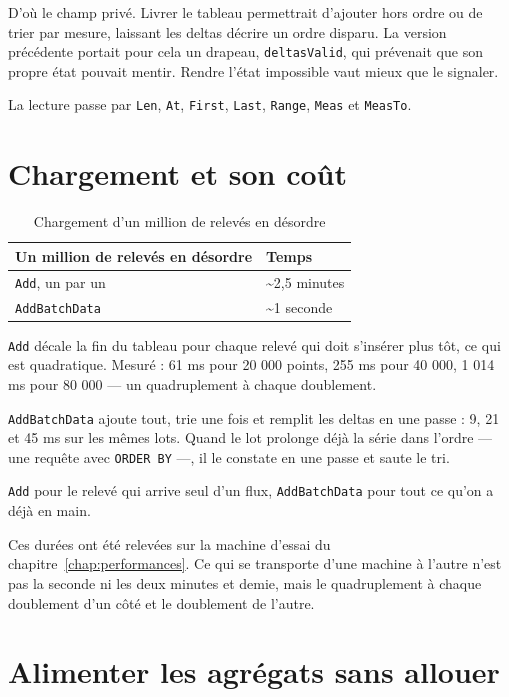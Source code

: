 \documentclass[11pt,a4paper]{report}
\begin{document}
D'où le champ privé. Livrer le tableau permettrait d'ajouter hors ordre
ou de trier par mesure, laissant les deltas décrire un ordre disparu. La
version précédente portait pour cela un drapeau, \texttt{deltasValid},
qui prévenait que son propre état pouvait mentir. Rendre l'état
impossible vaut mieux que le signaler.

La lecture passe par \texttt{Len}, \texttt{At}, \texttt{First},
\texttt{Last}, \texttt{Range}, \texttt{Meas} et \texttt{MeasTo}.

\section{Chargement et son coût}\label{sec:chargement}

\begin{longtable}[]{@{}ll@{}}
\caption{Chargement d'un million de relevés en désordre}\label{tab:chargement}\\
\toprule\noalign{}
Un million de relevés en désordre & Temps \\
\midrule\noalign{}
\endhead
\bottomrule\noalign{}
\endlastfoot
\texttt{Add}, un par un & \textasciitilde2,5 minutes \\
\texttt{AddBatchData} & \textasciitilde1 seconde \\
\end{longtable}

\texttt{Add} décale la fin du tableau pour chaque relevé qui doit
s'insérer plus tôt, ce qui est quadratique. Mesuré : 61 ms pour 20 000
points, 255 ms pour 40 000, 1 014 ms pour 80 000 --- un quadruplement à
chaque doublement.

\texttt{AddBatchData} ajoute tout, trie une fois et remplit les deltas
en une passe : 9, 21 et 45 ms sur les mêmes lots. Quand le lot prolonge
déjà la série dans l'ordre --- une requête avec \texttt{ORDER\ BY} ---,
il le constate en une passe et saute le tri.

\texttt{Add} pour le relevé qui arrive seul d'un flux,
\texttt{AddBatchData} pour tout ce qu'on a déjà en main.

Ces durées ont été relevées sur la machine d'essai du
chapitre~\ref{chap:performances}. Ce qui se transporte d'une machine à
l'autre n'est pas la seconde ni les deux minutes et demie, mais le
quadruplement à chaque doublement d'un côté et le doublement de l'autre.

\section{Alimenter les agrégats sans allouer}
\end{document}
